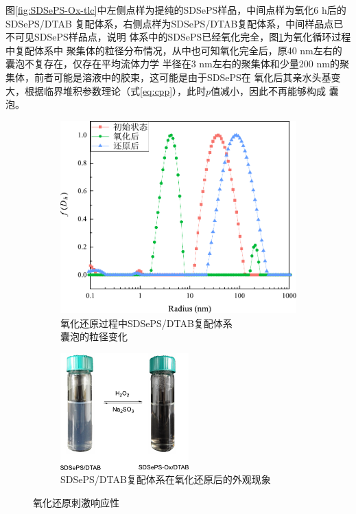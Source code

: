 \documentclass[bachelor,winfonts,replaceperiod]{jnuthesis}
\begin{document}
    图\ref{fig:SDSePS-Ox-tlc}中左侧点样为提纯的SDSePS样品，中间点样为氧化6 h后的SDSePS/DTAB
    复配体系，右侧点样为SDSePS/DTAB复配体系，中间样品点已不可见SDSePS样品点，说明
    体系中的SDSePS已经氧化完全，图\ref{fig:SDSePS-redox-radius}为氧化循环过程中复配体系中
    聚集体的粒径分布情况，从中也可知氧化完全后，原40 nm左右的囊泡不复存在，仅存在平均流体力学
    半径在3 nm左右的聚集体和少量200 nm的聚集体，前者可能是溶液中的胶束，这可能是由于SDSePS在
    氧化后其亲水头基变大，根据临界堆积参数理论（式\ref{eq:cpp}），此时$p$值减小，因此不再能够构成
    囊泡。
    
    \begin{figure}[htbp]
        \begin{subfigure}[]{.5\textwidth}
            \centering
            \includegraphics[width=.8\textwidth]{figure/SDSePS-redox-radius.pdf}
            \caption{氧化还原过程中SDSePS/DTAB复配体系\\ 囊泡的粒径变化}\label{fig:SDSePS-redox-radius}
        \end{subfigure}%
        \begin{subfigure}[]{.5\textwidth}
            \centering
            \includegraphics[height=4.5cm]{figure/scheme-SDSePS-redox.pdf}
            \caption{SDSePS/DTAB复配体系在氧化还原后的外观现象}\label{fig:scheme-SDSePS-redox}
        \end{subfigure}%
        \caption{氧化还原刺激响应性}
        \label{fig:氧化还原刺激响应性}
    \end{figure}
    
\end{document}
